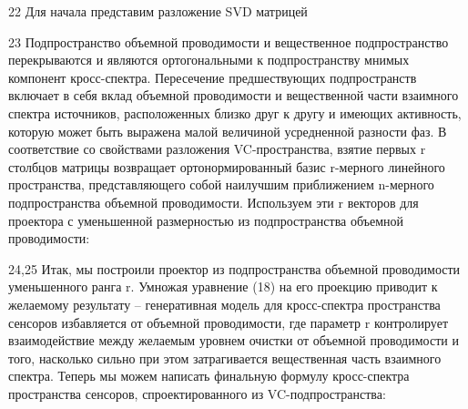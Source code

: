 22
Для начала представим разложение SVD матрицей 

23
Подпространство объемной проводимости и вещественное подпространство перекрываются и являются ортогональными к подпространству мнимых компонент кросс-спектра. Пересечение предшествующих подпространств включает в себя вклад объемной проводимости и вещественной части взаимного спектра источников, расположенных близко друг к другу и имеющих активность, которую может быть выражена малой величиной усредненной разности фаз. 
В соответствие со свойствами разложения VC-пространства, взятие первых r столбцов матрицы возвращает ортонормированный базис r-мерного линейного пространства, представляющего собой наилучшим приближением n-мерного подпространства объемной проводимости. Используем эти r векторов для проектора с уменьшенной размерностью из подпространства объемной проводимости:

24,25
Итак, мы построили проектор из подпространства объемной проводимости уменьшенного ранга r.
Умножая уравнение (18) на его проекцию приводит к желаемому результату – генеративная модель для кросс-спектра пространства сенсоров избавляется от объемной проводимости, где параметр r контролирует взаимодействие между желаемым уровнем очистки от объемной проводимости и того, насколько сильно при этом затрагивается вещественная часть взаимного спектра. Теперь мы можем написать финальную формулу кросс-спектра пространства сенсоров, спроектированного из VC-подпространства:

